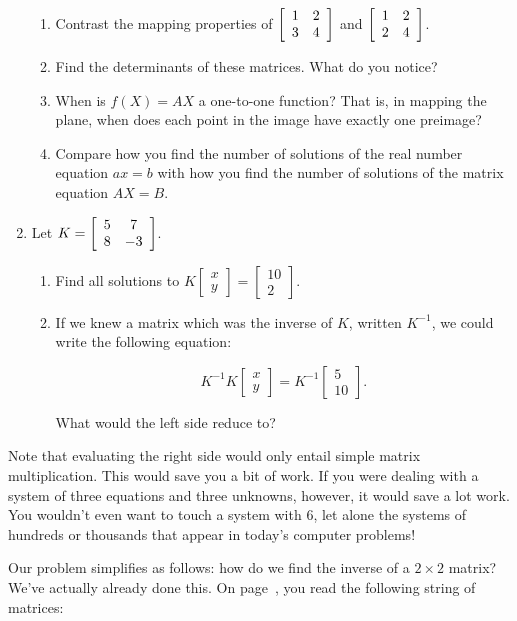 \documentclass[../gatm.tex]{subfiles}
\begin{document}
\begin{enumerate}
\begin{enumerate}
\item Contrast the mapping properties of $\left[\begin{array}{cc} 1 & 2 \\ 3 & 4 \end{array}\right]$ and $\left[\begin{array}{cc} 1 & 2 \\ 2 & 4 \end{array}\right]$.
\item Find the determinants of these matrices. What do you notice?
\item When is $f(X)=AX$ a one-to-one function? That is, in mapping the plane, when does each point in the image have exactly one preimage?
\item Compare how you find the number of solutions of the real number equation $ax=b$ with how you find the number of solutions of the matrix equation $AX=B$.
\end{enumerate}
\item Let $K=\left[\begin{array}{cc} 5 & 7 \\ 8 & -3 \end{array}\right]$.\begin{enumerate}
\item Find all solutions to $K\left[\begin{array}{c} x \\ y \end{array}\right]=\left[\begin{array}{c} 10 \\ 2 \end{array}\right]$.
\item If we knew a matrix which was the inverse of $K$, written $K^{-1}$, we could write the following equation:

$$K^{-1}K\left[\begin{array}{c} x \\ y \end{array}\right]=K^{-1}\left[\begin{array}{c} 5 \\ 10 \end{array}\right].$$

What would the left side reduce to?
\end{enumerate}
\setcounter{problem_i}{\value{enumi}}
\end{enumerate}

Note that evaluating the right side would only entail simple matrix multiplication. This would save you a bit of work. If you were dealing with a system of three equations and three unknowns, however, it would save a lot work. You wouldn't even want to touch a system with $6$, let alone the systems of hundreds or thousands that appear in today's computer problems!

Our problem simplifies as follows: how do we find the inverse of a $2\times 2$ matrix? We've actually already done this. On page~\pageref{prob:list_of_matrices}, you read the following string of matrices:
\end{document}
